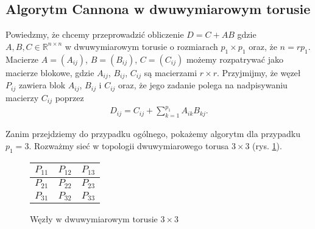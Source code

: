 
\subsection{Algorytm Cannona w dwuwymiarowym torusie}
Powiedzmy, że chcemy przeprowadzić obliczenie \(D = C + AB\) gdzie \(A, B, C\in\mathbb{R}^{n\times n}\) w dwuwymiarowym torusie o rozmiarach \(p_1 \times p_1\) oraz, że \(n=rp_1\). Macierze \(A=(A_{ij})\), \(B=(B_{ij})\), \(C=(C_{ij})\) możemy rozpatrywać jako macierze blokowe, gdzie \(A_{ij}\), \(B_{ij}\), \(C_{ij}\) są macierzami \(r\times r\). Przyjmijmy, że węzeł \(P_{ij}\) zawiera blok \(A_{ij}\), \(B_{ij}\) i \(C_{ij}\) oraz, że jego zadanie polega na nadpisywaniu macierzy \(C_{ij}\) poprzez
\begin{align}\label{eq:cannon_per_node}
D_{ij}=C_{ij} + \sum_{k=1}^{p_1} A_{ik}B_{kj}.
\end{align}

Zanim przejdziemy do przypadku ogólnego, pokażemy algorytm dla przypadku \(p_1 = 3\). Rozważmy sieć w topologii dwuwymiarowego torusa \(3\times 3\) (rys. \ref{fig:cannon_torus1}).

\begin{figure}[h]
\centering
\begin{tabular}{|C{1.5cm}|C{1.5cm}|C{1.5cm}|}
\hline
\(P_{11}\) & \(P_{12}\) & \(P_{13}\) \\
\hline
\(P_{21}\) & \(P_{22}\) & \(P_{23}\) \\
\hline
\(P_{31}\) & \(P_{32}\) & \(P_{33}\) \\
\hline
\end{tabular}
\caption{Węzły w dwuwymiarowym torusie \(3\times 3\)}
\label{fig:cannon_torus1}
\end{figure}

